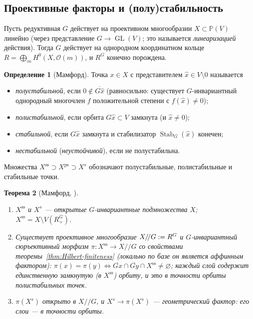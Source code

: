 \documentclass[11pt,a4paper]{article}
\theoremstyle{plain}
\newtheorem{theorem}{Теорема}[section]
\theoremstyle{definition}
\newtheorem{definition}[theorem]{Определение}
\theoremstyle{remark}
\newcommand{\PP}{\mathbb{P}}
\newcommand{\cO}{\mathcal{O}}
\DeclareMathOperator{\GL}{GL}
\DeclareMathOperator{\Stab}{Stab}
\let\Proj\relax
\DeclareMathOperator{\Proj}{Proj}
\newcommand{\ssl}{\mathrm{ss}}
\begin{document}
\subsection{Проективные факторы и (полу)стабильность}

Пусть редуктивная $G$ действует на проективном многообразии $X\subset\PP(V)$ линейно (через
представление $G\to\GL(V)$; это называется \emph{линеаризацией} действия). Тогда $G$ действует
на однородном координатном кольце $R=\bigoplus_mH^0(X,\cO(m))$, и $R^G$ конечно порождена.

\begin{definition}[Мамфорд]\label{def:GIT-stability}
Точка $x\in X$ с представителем $\hat x\in V\setminus0$ называется
\begin{itemize}
\item \emph{полустабильной}, если $0\notin\overline{G\hat x}$ (равносильно: существует
$G$-инвариантный однородный многочлен $f$ положительной степени с $f(\hat x)\ne0$);
\item \emph{полистабильной}, если орбита $G\hat x\subset V$ замкнута (и $\hat x\ne0$);
\item \emph{стабильной}, если $G\hat x$ замкнута и стабилизатор $\Stab_G(\hat x)$ конечен;
\item \emph{нестабильной} (\emph{неустойчивой}), если не полустабильна.
\end{itemize}
Множества $X^{\ssl}\supset X^{\mathrm{ps}}\supset X^{s}$ обозначают полустабильные, полистабильные и
стабильные точки.
\end{definition}

\begin{theorem}[{Мамфорд, \cite[гл.~1]{MFK}}]\label{thm:GIT}
\begin{enumerate}
\item $X^{\ssl}$ и $X^s$ --- открытые $G$-инвариантные подмножества $X$; $X^{\ssl}=X\setminus V(R^G_+)$.
\item Существует проективное многообразие $X/\!/G:=\Proj R^G$ и $G$-инвариантный сюръективный
морфизм $\pi\colon X^{\ssl}\to X/\!/G$ со свойствами теоремы~\ref{thm:Hilbert-finiteness} \textup{(}локально
по базе он является аффинным фактором\textup{)}: $\pi(x)=\pi(y)\iff\overline{Gx}\cap\overline{Gy}\cap X^{\ssl}\ne\varnothing$;
каждый слой содержит единственную замкнутую \textup{(}в $X^{\ssl}$\textup{)} орбиту, и это в точности орбиты
полистабильных точек.
\item $\pi(X^s)$ открыто в $X/\!/G$, и $X^s\to\pi(X^s)$ --- \emph{геометрический фактор}: его
слои --- в точности орбиты.
\end{enumerate}
\end{theorem}
\end{document}
